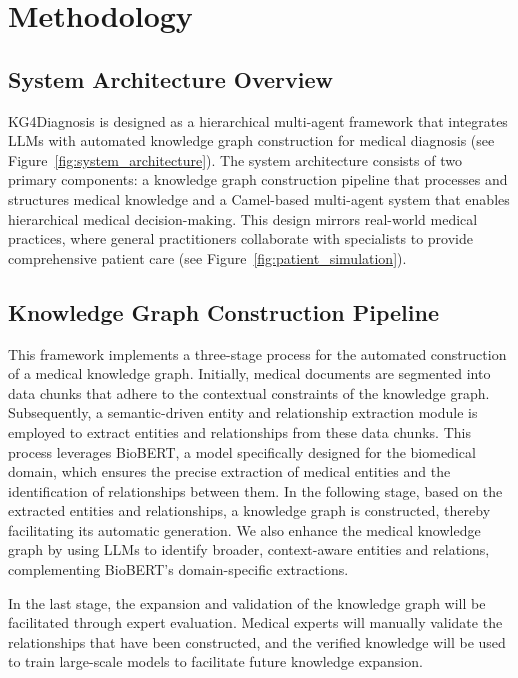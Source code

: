 \documentclass[letterpaper]{article} %
\begin{document}
\section{Methodology}

\subsection{System Architecture Overview}

KG4Diagnosis is designed as a hierarchical multi-agent framework that integrates LLMs with automated knowledge graph construction for medical diagnosis (see Figure~\ref{fig:system_architecture}). The system architecture consists of two primary components: a knowledge graph construction pipeline that processes and structures medical knowledge and a Camel-based multi-agent system that enables hierarchical medical decision-making. This design mirrors real-world medical practices, where general practitioners collaborate with specialists to provide comprehensive patient care (see Figure~\ref{fig:patient_simulation}).

\subsection{Knowledge Graph Construction Pipeline}
This framework implements a three-stage process for the automated construction of a medical knowledge graph. Initially, medical documents are segmented into data chunks that adhere to the contextual constraints of the knowledge graph. Subsequently, a semantic-driven entity and relationship extraction module is employed to extract entities and relationships from these data chunks. This process leverages BioBERT, a model specifically designed for the biomedical domain, which ensures the precise extraction of medical entities and the identification of relationships between them. In the following stage, based on the extracted entities and relationships, a knowledge graph is constructed, thereby facilitating its automatic generation. We also enhance the medical knowledge graph by using LLMs to identify broader, context-aware entities and relations, complementing BioBERT's domain-specific extractions.

In the last stage, the expansion and validation of the knowledge graph will be facilitated through expert evaluation. Medical experts will manually validate the relationships that have been constructed, and the verified knowledge will be used to train large-scale models to facilitate future knowledge expansion.
\end{document}
